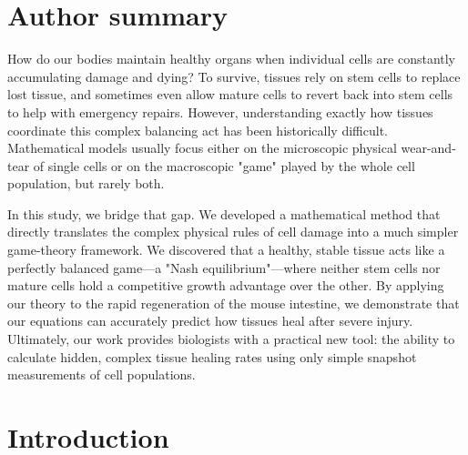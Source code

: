 \documentclass[pdflatex,sn-mathphys-ay]{sn-jnl}
\theoremstyle{thmstyleone}
\theoremstyle{definition}
\theoremstyle{remark}
\begin{document}

\maketitle

\section*{Author summary}
How do our bodies maintain healthy organs when individual cells are constantly accumulating damage and dying? To survive, tissues rely on stem cells to replace lost tissue, and sometimes even allow mature cells to revert back into stem cells to help with emergency repairs. However, understanding exactly how tissues coordinate this complex balancing act has been historically difficult. Mathematical models usually focus either on the microscopic physical wear-and-tear of single cells or on the macroscopic "game" played by the whole cell population, but rarely both.

In this study, we bridge that gap. We developed a mathematical method that directly translates the complex physical rules of cell damage into a much simpler game-theory framework. We discovered that a healthy, stable tissue acts like a perfectly balanced game—a "Nash equilibrium"—where neither stem cells nor mature cells hold a competitive growth advantage over the other. By applying our theory to the rapid regeneration of the mouse intestine, we demonstrate that our equations can accurately predict how tissues heal after severe injury. Ultimately, our work provides biologists with a practical new tool: the ability to calculate hidden, complex tissue healing rates using only simple snapshot measurements of cell populations.

\section{Introduction}
\end{document}

